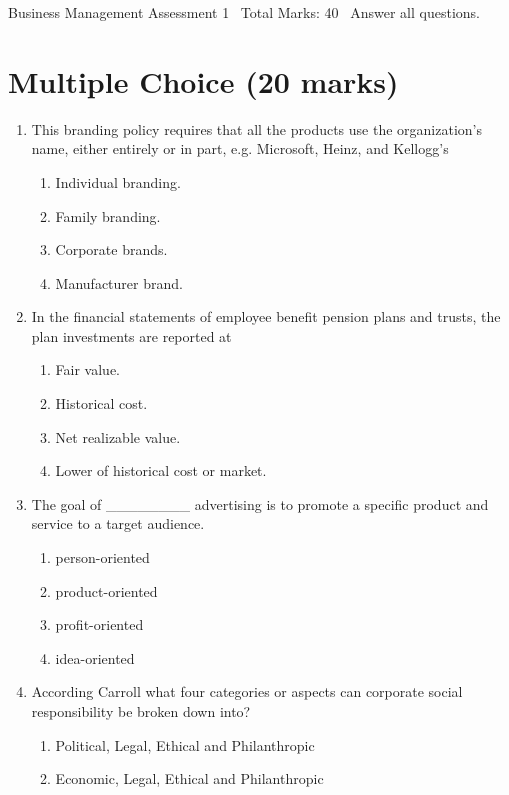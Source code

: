 \documentclass[12pt]{article}
\begin{document}
\begin{center}
Business Management Assessment 1 \
Total Marks: 40 \
Answer all questions.
\end{center}

\section*{Multiple Choice (20 marks)}
\begin{enumerate}[label=\arabic*.]
\item This branding policy requires that all the products use the organization's name, either entirely or in part, e.g. Microsoft, Heinz, and Kellogg's
\begin{enumerate}[label=(\alph*)]
    \item Individual branding.
    \item Family branding.
    \item Corporate brands.
    \item Manufacturer brand.
\end{enumerate}
\item In the financial statements of employee benefit pension plans and trusts, the plan investments are reported at
\begin{enumerate}[label=(\alph*)]
    \item Fair value.
    \item Historical cost.
    \item Net realizable value.
    \item Lower of historical cost or market.
\end{enumerate}
\item The goal of \_\_\_\_\_\_\_\_ advertising is to promote a specific product and service to a target audience.
\begin{enumerate}[label=(\alph*)]
    \item person-oriented
    \item product-oriented
    \item profit-oriented
    \item idea-oriented
\end{enumerate}
\item According Carroll what four categories or aspects can corporate social responsibility be broken down into?
\begin{enumerate}[label=(\alph*)]
    \item Political, Legal, Ethical and Philanthropic
    \item Economic, Legal, Ethical and Philanthropic

\end{enumerate}
\end{enumerate}
\end{document}

